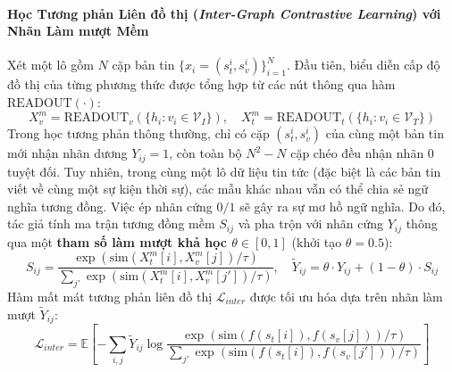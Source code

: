\documentclass[conference,10pt]{IEEEtran}
\begin{document}
\paragraph{Học Tương phản Liên đồ thị (\textit{Inter-Graph Contrastive Learning}) với Nhãn Làm mượt Mềm}
Xét một lô gồm $N$ cặp bản tin $\{x_i = (s_t^i, s_v^i)\}_{i=1}^N$. Đầu tiên, biểu diễn cấp độ đồ thị của từng phương thức được tổng hợp từ các nút thông qua hàm $\text{READOUT}(\cdot)$:
\begin{equation}
    X_v^m = \text{READOUT}_v\left(\{h_i : v_i \in \mathcal{V}_I\}\right), \quad X_t^m = \text{READOUT}_t\left(\{h_i : v_i \in \mathcal{V}_T\}\right)
    \label{eq:cmavrp_readout}
\end{equation}
Trong học tương phản thông thường, chỉ có cặp $(s_t^i, s_v^i)$ của cùng một bản tin mới nhận nhãn dương $Y_{ij} = 1$, còn toàn bộ $N^2 - N$ cặp chéo đều nhận nhãn $0$ tuyệt đối. Tuy nhiên, trong cùng một lô dữ liệu tin tức (đặc biệt là các bản tin viết về cùng một sự kiện thời sự), các mẫu khác nhau vẫn có thể chia sẻ ngữ nghĩa tương đồng. Việc ép nhãn cứng $0/1$ sẽ gây ra sự mơ hồ ngữ nghĩa. Do đó, tác giả tính ma trận tương đồng mềm $S_{ij}$ và pha trộn với nhãn cứng $Y_{ij}$ thông qua một \textbf{tham số làm mượt khả học $\theta \in [0, 1]$} (khởi tạo $\theta = 0.5$):
\begin{equation}
    S_{ij} = \frac{\exp\left(\text{sim}\left(X_t^m[i], X_v^m[j]\right) / \tau\right)}{\sum_{j'} \exp\left(\text{sim}\left(X_t^m[i], X_v^m[j']\right) / \tau\right)}, \quad \tilde{Y}_{ij} = \theta \cdot Y_{ij} + (1 - \theta) \cdot S_{ij}
    \label{eq:cmavrp_softlabel}
\end{equation}
Hàm mất mát tương phản liên đồ thị $\mathcal{L}_{inter}$ được tối ưu hóa dựa trên nhãn làm mượt $\tilde{Y}_{ij}$:
\begin{equation}
    \mathcal{L}_{inter} = \mathbb{E} \left[ - \sum_{i,j} \tilde{Y}_{ij} \log \frac{\exp\left(\text{sim}\left(f(s_t[i]), f(s_v[j])\right) / \tau\right)}{\sum_{j'} \exp\left(\text{sim}\left(f(s_t[i]), f(s_v[j'])\right) / \tau\right)} \right]
    \label{eq:cmavrp_linter}
\end{equation}
\end{document}
